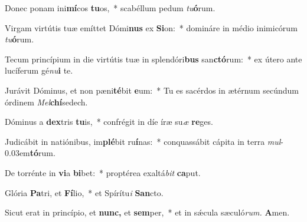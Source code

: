 \item Donec ponam ini\textbf{mí}cos \textbf{tu}os,~* scabéllum pedum \textit{tu}\textbf{ó}rum.
\item Virgam virtútis tuæ emíttet Dómi\textbf{nus} ex \textbf{Si}on:~* domináre in médio inimicórum \textit{tu}\textbf{ó}rum.
\item Tecum princípium in die virtútis tuæ in splendóri\textbf{bus} san\textbf{ctó}rum:~* ex útero ante lucíferum gé\textit{nu}\textbf{i} te.
\item Jurávit Dóminus, et non pæni\textbf{té}bit \textbf{e}um:~* Tu es sacérdos in ætérnum secúndum órdinem \textit{Mel}\textbf{chí}sedech.
\item Dóminus a \textbf{dex}tris \textbf{tu}is,~* confrégit in díe íræ su\hspace{0.03em}\textit{æ} \textbf{re}ges.
\item Judicábit in natiónibus, im\textbf{plé}bit ru\textbf{í}nas:~* conquassábit cápita in terra \textit{mul}\kern -0.03em\textbf{tó}rum.
\item De torrénte in \textbf{vi}a \textbf{bi}bet:~* proptérea exaltá\textit{bit} \textbf{ca}put.
\item Glória \textbf{Pa}tri, et \textbf{Fí}lio,~* et Spírítu\textit{i} \textbf{San}cto.
\item Sicut erat in princípio, et \textbf{nunc,} et \textbf{sem}per,~* et in sǽcula sæculó\textit{rum.} \textbf{A}men.